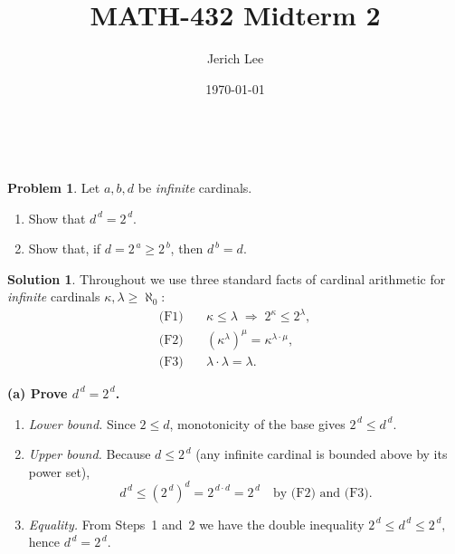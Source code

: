\documentclass[12pt]{article}
\title{MATH-432 Midterm 2}
\author{Jerich Lee}
\date{\today}
\theoremstyle{definition} %
\newtheorem{solution}{Solution}
\newtheorem{problem}{Problem}
\theoremstyle{plain} %
\begin{document}
\maketitle
\  \begin{problem}
    Let $a,b,d$ be \emph{infinite} cardinals.
    
    \begin{enumerate}[label=\textup{(\alph*)}]
      \item Show that $d^{\,d}=2^{\,d}$.
      \item Show that, if $d=2^{\,a}\ge 2^{\,b}$, then $d^{\,b}=d$.
    \end{enumerate}
    \end{problem}
    
    \begin{solution}
    Throughout we use three standard facts of cardinal arithmetic for \emph{infinite}
    cardinals $\kappa,\lambda\ge\aleph_0$:
    \begin{align}
      \text{(F1)}\quad & \kappa\le\lambda \;\Longrightarrow\;
                         2^{\kappa}\le 2^{\lambda}, \\[2pt]
      \text{(F2)}\quad &
          (\kappa^{\lambda})^{\mu}= \kappa^{\lambda\cdot\mu}, \\[2pt]
      \text{(F3)}\quad &
          \lambda\cdot\lambda=\lambda.
    \end{align}
    
    \medskip
    \noindent\textbf{(a)  Prove $d^{\,d}=2^{\,d}$.}
    
    \begin{enumerate}
      \item[] \emph{Lower bound.}  
            Since $2\le d$, monotonicity of the base gives
            \(
              2^{\,d}\le d^{\,d}.
            \)
    
      \item[] \emph{Upper bound.}  
            Because $d\le 2^{\,d}$ (any infinite cardinal is
            bounded above by its power set),
            \[
                d^{\,d}\le(2^{\,d})^{d}
                       = 2^{\,d\cdot d}
                       = 2^{\,d} \quad\text{by (F2) and (F3).}
            \]
    
      \item[] \emph{Equality.}  
            From Steps~1 and~2 we have the double inequality
            \(
               2^{\,d}\le d^{\,d}\le 2^{\,d},
            \)
            hence $d^{\,d}=2^{\,d}$.
    \end{enumerate}
    

\end{solution}
\end{document}
